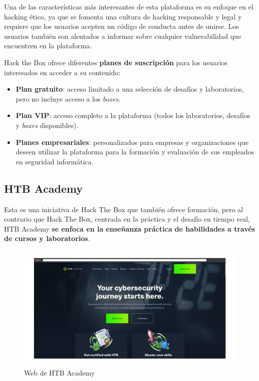     Una de las características más interesantes de esta plataforma es su enfoque en el hacking ético, ya que se fomenta una cultura de hacking responsable y legal y requiere que los usuarios acepten un código de conducta antes de unirse. Los usuarios también son alentados a informar sobre cualquier vulnerabilidad que encuentren en la plataforma.
    
    Hack the Box ofrece diferentes \textbf{planes de suscripción} para los usuarios interesados en acceder a su contenido:
    
    \begin{itemize}
        \item \textbf{Plan gratuito}: acceso limitado a una selección de desafíos y laboratorios, pero no incluye acceso a los \textit{boxes}.
    
        \item \textbf{Plan VIP}: acceso completo a la plataforma (todos los laboratorios, desafíos y \textit{boxes} disponibles).
    
        \item \textbf{Planes empresariales}: personalizados para empresas y organizaciones que deseen utilizar la plataforma para la formación y evaluación de sus empleados en seguridad informática.
    \end{itemize}
    
    \newpage
    
    
    \subsection{HTB Academy}
    
    Esta es una iniciativa de Hack The Box que también ofrece formación, pero al contrario que Hack The Box, centrada en la práctica y el desafío en tiempo real, HTB Academy \textbf{se enfoca en la enseñanza práctica de habilidades a través de cursos y laboratorios}.
    
    \begin{figure}[h]
        \centering
        \includegraphics[width=\textwidth]{images/Capturas/Web de HTB Academy.png}
        \caption{Web de HTB Academy}
        \label{fig:HTB-Academy-web}
    \end{figure}
    
